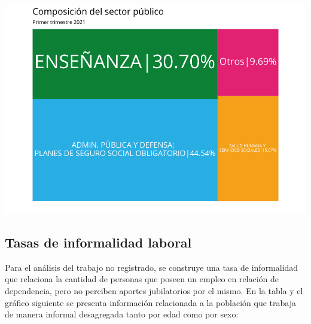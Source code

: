 \documentclass[
]{article}
\begin{document}
\includegraphics{Informe-Mercado-Laboral_files/figure-latex/unnamed-chunk-32-1.pdf}

\hypertarget{tasas-de-informalidad-laboral}{%
\subsection{Tasas de informalidad
laboral}\label{tasas-de-informalidad-laboral}}

Para el análisis del trabajo no registrado, se construye una tasa de
informalidad que relaciona la cantidad de personas que poseen un empleo
en relación de dependencia, pero no perciben aportes jubilatorios por el
mismo. En la tabla y el gráfico siguiente se presenta información
relacionada a la población que trabaja de manera informal desagregada
tanto por edad como por sexo:
\end{document}
